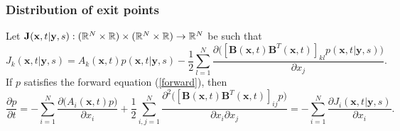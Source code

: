 \documentclass{article}
\newcommand{\mb}{\mathbf}
\begin{document}
\subsubsection{Distribution of exit points }
Let ${\mb J}({\mb x},t|{\mb y},s):(\R^N\times\R)\times(\R^N\times\R)\to \R^N$ be such that 
$$J_k({\mb x},t|{\mb y},s)=A_k({\mb x},t)p({\mb x},t|{\mb y},s)-\frac{1}{2}\sum_{l=1}^N\frac{\partial \big([{\mb B}({\mb x},t){\mb B}^T({\mb x},t)]_{kl}p({\mb x},t|{\mb y},s)\big)}{\partial x_j}.$$ 
If $p$ satisfies the forward equation (\ref{forward}), then 
\begin{equation}
\frac{\partial p}{\partial t} =-\sum_{i=1}^N\frac{\partial \big(A_i({\mb x},t)p\big)}{\partial x_i}+\frac{1}{2}\sum_{i,j=1}^N\frac{\partial^2\big([{\mb B}({\mb x},t){\mb B}^T({\mb x},t)]_{ij}p\big)}{\partial x_i\partial x_j}=-\sum_{i=1}^N\frac{\partial J_i({\mb x},t|{\mb y},s)}{\partial x_i}. \label{jequals}
\end{equation}
\end{document}
